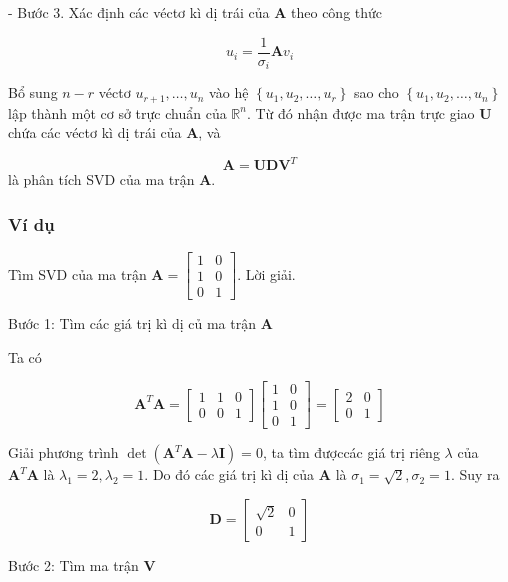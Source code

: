 \documentclass[12pt,a4paper,oneside]{report}
\numberwithin{equation}{section}
\begin{document}
- Bước 3. Xác định các véctơ kì dị trái của $\mathbf{A}$ theo công thức

$$
u_{i}=\frac{1}{\sigma_{i}} \mathbf{A} v_{i}
$$

Bổ sung $n-r$ véctơ $u_{r+1}, \ldots, u_{n}$ vào hệ $\left\{u_{1}, u_{2}, \ldots, u_{r}\right\}$ sao cho $\left\{u_{1}, u_{2}, \ldots, u_{n}\right\}$ lập thành một cơ sở trực chuẩn của $\mathbb{R}^{n}$. Từ đó nhận được ma trận trực giao $\mathbf{U}$ chứa các véctơ kì dị trái của $\mathbf{A}$, và

$$
\mathbf{A}=\mathbf{U D V}^{T}
$$
là phân tích SVD của ma trận $\mathbf{A}$.

\subsubsection{Ví dụ}

Tìm SVD của ma trận $\mathbf{A}=\left[\begin{array}{ll}1 & 0 \\ 1 & 0 \\ 0 & 1\end{array}\right]$. Lời giải.

Bước 1: Tìm các giá trị kì dị củ ma trận $\mathbf{A}$

Ta có

$$
\mathbf{A}^{T} \mathbf{A}=\left[\begin{array}{lll}
	1 & 1 & 0 \\
	0 & 0 & 1
\end{array}\right]\left[\begin{array}{ll}
	1 & 0 \\
	1 & 0 \\
	0 & 1
\end{array}\right]=\left[\begin{array}{ll}
	2 & 0 \\
	0 & 1
\end{array}\right]
$$

Giải phương trình $\operatorname{det}\left(\mathbf{A}^{T} \mathbf{A}-\lambda \mathbf{I}\right)=0$, ta tìm đượccác giá trị riêng $\lambda$ của $\mathbf{A}^{T} \mathbf{A}$ là $\lambda_{1}=2, \lambda_{2}=1$. Do đó các giá trị kì dị của $\mathbf{A}$ là $\sigma_{1}=\sqrt{2}, \sigma_{2}=1$. Suy ra

$$
\mathbf{D}=\left[\begin{array}{cc}
	\sqrt{2} & 0 \\
	0 & 1
\end{array}\right]
$$

Bước 2: Tìm ma trận $\mathbf{V}$
\end{document}
